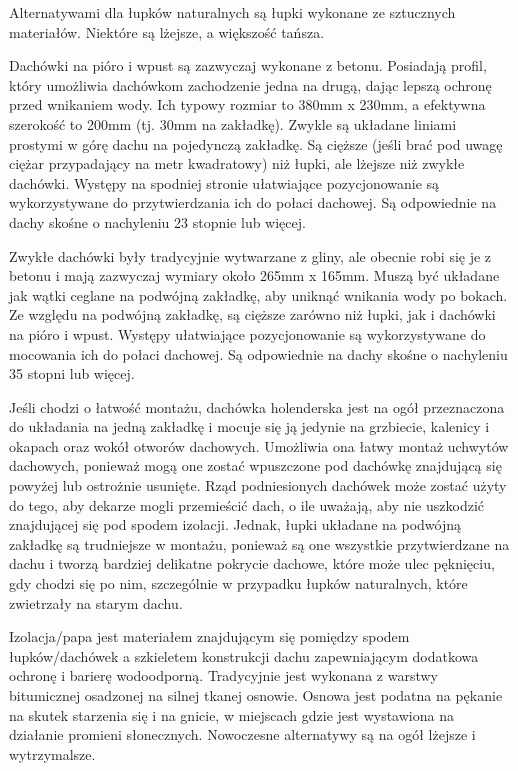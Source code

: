 \documentclass[12pt,a4paper]{article}
\begin{document}
Alternatywami dla łupków naturalnych są łupki wykonane ze sztucznych 
materiałów. Niektóre są lżejsze, a większość tańsza. 
 
Dachówki na pióro i wpust są zazwyczaj wykonane z betonu. Posiadają 
profil, który umożliwia dachówkom zachodzenie jedna na drugą, dając 
lepszą ochronę przed wnikaniem wody. Ich typowy rozmiar to 380mm x 
230mm, a efektywna szerokość to 200mm (tj. 30mm na zakładkę). Zwykle są 
układane liniami prostymi w górę dachu na pojedynczą zakładkę. Są 
cięższe (jeśli brać pod uwagę ciężar przypadający na metr kwadratowy) 
niż łupki, ale lżejsze niż zwykłe dachówki. Występy na spodniej stronie 
ułatwiające pozycjonowanie są wykorzystywane do przytwierdzania ich do 
połaci dachowej. Są odpowiednie na dachy skośne o nachyleniu 23 stopnie 
lub więcej. 


Zwykłe dachówki były tradycyjnie wytwarzane z gliny, ale obecnie robi 
się je z betonu i mają zazwyczaj wymiary około 265mm x 165mm. Muszą być 
układane jak wątki ceglane na podwójną zakładkę, aby uniknąć wnikania 
wody po bokach. Ze względu na podwójną zakładkę, są cięższe zarówno niż 
łupki, jak i dachówki na pióro i wpust. Występy ułatwiające 
pozycjonowanie są wykorzystywane do mocowania ich do połaci dachowej. Są 
odpowiednie na dachy skośne o nachyleniu 35 stopni lub więcej. 

Jeśli chodzi o łatwość montażu, dachówka holenderska jest na ogół 
przeznaczona do układania na jedną zakładkę i mocuje się ją jedynie na 
grzbiecie, kalenicy i okapach oraz wokół otworów dachowych. Umożliwia 
ona łatwy montaż uchwytów dachowych, ponieważ mogą one zostać wpuszczone 
pod dachówkę znajdującą się powyżej lub ostrożnie usunięte. Rząd 
podniesionych dachówek może zostać użyty do tego, aby dekarze mogli 
przemieścić dach, o ile uważają, aby nie uszkodzić znajdującej się pod 
spodem izolacji. Jednak, łupki układane na podwójną zakładkę są 
trudniejsze w montażu, ponieważ są one wszystkie przytwierdzane na dachu 
i tworzą bardziej delikatne pokrycie dachowe, które może ulec pęknięciu, 
gdy chodzi się po nim, szczególnie w przypadku łupków naturalnych, które 
zwietrzały na starym dachu. 

Izolacja/papa jest materiałem znajdującym się pomiędzy spodem 
łupków/dachówek a szkieletem konstrukcji dachu zapewniającym dodatkowa 
ochronę i barierę wodoodporną. Tradycyjnie jest wykonana z warstwy 
bitumicznej osadzonej na silnej tkanej osnowie. Osnowa jest podatna na 
pękanie na skutek starzenia się i na gnicie, w miejscach gdzie jest 
wystawiona na działanie promieni słonecznych. Nowoczesne alternatywy są 
na ogół lżejsze i wytrzymalsze. 
\end{document}

